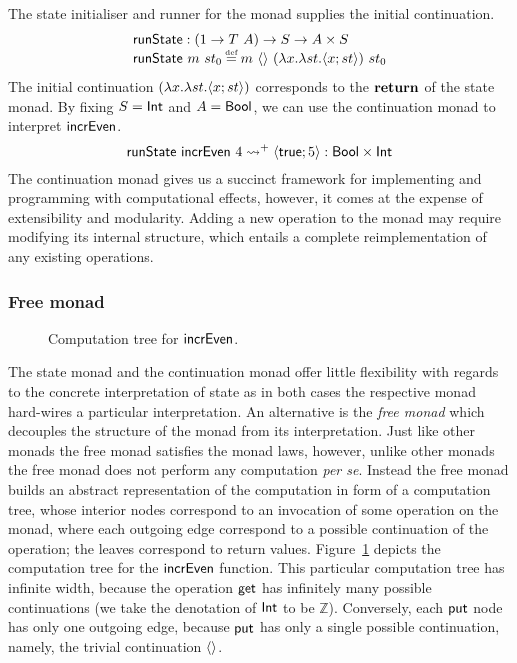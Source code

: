 \documentclass[12pt,phd,lfcs,twoside,openright,logo,leftchapter,normalheadings]{infthesis}
\theoremstyle{plain}
\theoremstyle{definition}
\begin{document}
The state initialiser and runner for the monad supplies the initial
continuation.
%
\[
  \bl
    \runState : (\UnitType \to T~A) \to S \to A \times S\\
    \runState~m~st_0 \defas m~\Unit~(\lambda x.\lambda st. \Record{x;st})~st_0
  \el
\]
%
The initial continuation $(\lambda x.\lambda st. \langle x;st \rangle)$
corresponds to the $\mathbf{return}$ of the state monad.
%
By fixing $S = \mathsf{Int}$ and $A = \mathsf{Bool}$, we can use the continuation
monad to interpret $\mathsf{incrEven}$.
%
\[
  \mathsf{runState}~\mathsf{incrEven}~4 \leadsto^+ \langle \mathsf{true};5 \rangle : \mathsf{Bool} \times \mathsf{Int}
\]
%
The continuation monad gives us a succinct framework for implementing
and programming with computational effects, however, it comes at the
expense of extensibility and modularity. Adding a new operation to the
monad may require modifying its internal structure, which entails a
complete reimplementation of any existing operations.

\subsubsection{Free monad}
%
\begin{figure}
  \centering
  \compTreeEx
  \caption{Computation tree for $\mathsf{incrEven}$.}\label{fig:comptree}
\end{figure}
%
The state monad and the continuation monad offer little flexibility
with regards to the concrete interpretation of state as in both cases
the respective monad hard-wires a particular interpretation. An
alternative is the \emph{free monad} which decouples the structure of
the monad from its interpretation.
%
Just like other monads the free monad satisfies the monad laws,
however, unlike other monads the free monad does not perform any
computation \emph{per se}. Instead the free monad builds an abstract
representation of the computation in form of a computation tree, whose
interior nodes correspond to an invocation of some operation on the
monad, where each outgoing edge correspond to a possible continuation
of the operation; the leaves correspond to return
values. Figure~\ref{fig:comptree} depicts the computation tree for the
$\mathsf{incrEven}$ function. This particular computation tree has infinite
width, because the operation $\mathsf{get}$ has infinitely many possible
continuations (we take the denotation of $\mathsf{Int}$ to be
$\mathbb{Z}$). Conversely, each $\mathsf{put}$ node has only one outgoing
edge, because $\mathsf{put}$ has only a single possible continuation, namely,
the trivial continuation $\langle  \rangle$.
\end{document}
